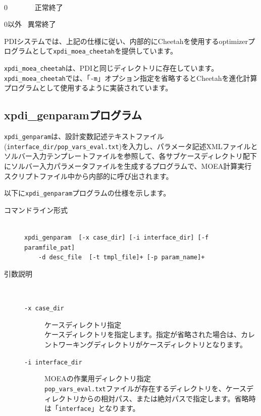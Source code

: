 \documentclass[a4paper,11pt]{jarticle}
\begin{document}
{\begin{description}
\begin{description}
\end{description}

\item[戻り値(終了ステータス)] {\ }\\
0 \ \ \ \ \ \ \ 正常終了

0以外 \ 異常終了
\end{description}

PDIシステムでは、上記の仕様に従い、内部的にCheetahを使用するoptimizerプログラムとして{\tt xpdi\_moea\_cheetah}を提供しています。

{\tt xpdi\_moea\_cheetah}は、PDIと同じディレクトリに存在しています。
{\tt xpdi\_moea\_cheetah}では、「{\tt -m}」オプション指定を省略するとCheetahを進化計算プログラムとして使用するように実装されています。


\newpage
\subsection{xpdi\_genparamプログラム}

{\tt xpdi\_genparam}は、設計変数記述テキストファイル({\tt interface\_dir/pop\_vars\_eval.txt})を入力し、パラメータ記述XMLファイルとソルバー入力テンプレートファイルを参照して、各サブケースディレクトリ配下にソルバー入力パラメータファイルを生成するプログラムで、MOEA計算実行スクリプトファイル中から内部的に呼び出されます。

以下に{\tt xpdi\_genparam}プログラムの仕様を示します。

\begin{description}
\item[コマンドライン形式] {\ }\\
{\tt xpdi\_genparam \ [-x case\_dir] [-i interface\_dir] [-f paramfile\_pat]}\\
\ \ \ \ {\tt -d desc\_file \ [-t tmpl\_file]+ [-p param\_name]+}


\item[引数説明] {\ }\par
\begin{description}
\item[{\tt -x  case\_dir}] ケースディレクトリ指定\\
ケースディレクトリを指定します。指定が省略された場合は、カレントワーキングディレクトリがケースディレクトリとなります。\\

\item[{\tt -i  interface\_dir}] MOEAの作業用ディレクトリ指定\\
{\tt pop\_vars\_eval.txt}ファイルが存在するディレクトリを、ケースディレクトリからの相対パス、または絶対パスで指定します。省略時は「{\tt interface}」となります。\\


\end{description}
\end{description}}
\end{document}
